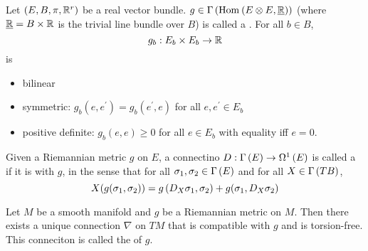 \documentclass[main.tex]{subfiles}
\begin{document}
 Let $(E, B, \pi, \mathbb{R}^r)$ be a real vector bundle. $g \in \Gamma\left( \text{Hom}_{}\left( E \otimes E, \underline{\mathbb{R}} \right) \right)$ (where $\underline{\mathbb{R}} = B \times \mathbb{R} $ is the trivial line bundle over $B$) is called a .
For all $b \in B$,
\[
g_b: E_b \times E_b \to \mathbb{R}
\] is
\begin{itemize}
  \item bilinear
  \item symmetric: $g_b(e,e^\prime) = g_b(e^\prime, e)$ for all $e, e^\prime \in E_b$
  \item positive definite: $g_b(e, e) \geq 0$ for all $e \in E_b$ with equality iff $e = 0$.
\end{itemize}

Given a Riemannian metric $g$ on $E$, a connectino $D: \Gamma\left( E \right) \to \Omega^{1}\left( E \right)$ is called a  if it is  with $g$, in the sense that for all $\sigma_1, \sigma_2 \in \Gamma\left( E \right)$ and for all $X \in \Gamma\left( TB \right)$,
\[
X(g(\sigma_1, \sigma_2)) = g\left(  D_X \sigma_1, \sigma_2  \right) + g(\sigma_1, D_X \sigma_2)
 \]

\begin{prop}
  Let $M$ be a smooth manifold and $g$ be a Riemannian metric on $M$. Then there exists a unique connection $\nabla$ on $TM$ that is compatible with $g$ and is torsion-free. This conneciton is called the  of $g$.
\end{prop}
\end{document}
